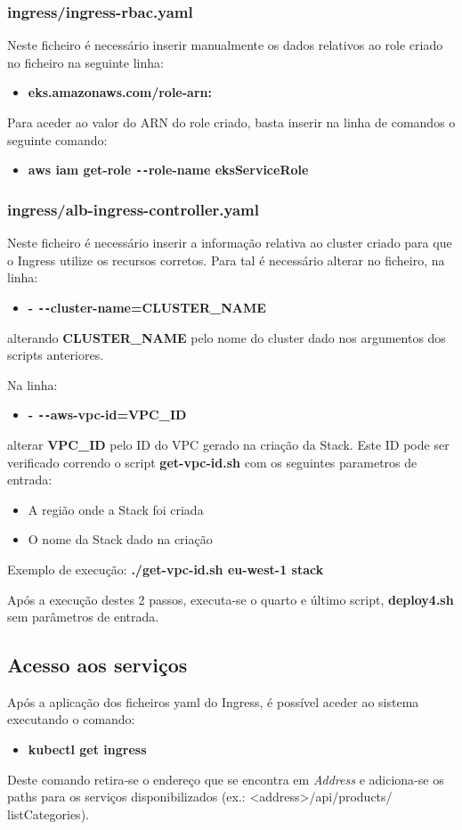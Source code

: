 \documentclass[11pt,a4paper]{article}
\begin{document}
\subsubsection{ingress/ingress-rbac.yaml}
Neste ficheiro é necessário inserir manualmente os dados relativos ao role criado no ficheiro na seguinte linha:
\begin{itemize}
	\item \textbf{eks.amazonaws.com/role-arn:}
\end{itemize}
Para aceder ao valor do ARN do role criado, basta inserir na linha de comandos o seguinte comando:
\begin{itemize}
	\item \textbf{aws iam get-role \texttt{-{}-}role-name eksServiceRole}
\end{itemize}

\subsubsection{ingress/alb-ingress-controller.yaml}
Neste ficheiro é necessário inserir a informação relativa ao cluster criado para que o Ingress utilize os recursos corretos. Para tal é necessário alterar no ficheiro, na linha: 
\begin{itemize}
	\item \textbf{- \texttt{-{}-}cluster-name=CLUSTER\_NAME}
\end{itemize}
alterando \textbf{CLUSTER\_NAME} pelo nome do cluster dado nos argumentos dos scripts anteriores.

Na linha:
\begin{itemize}
	\item \textbf{- \texttt{-{}-}aws-vpc-id=VPC\_ID}
\end{itemize}
alterar \textbf{VPC\_ID} pelo ID do VPC gerado na criação da Stack. Este ID pode ser verificado correndo o script \textbf{get-vpc-id.sh} com os seguintes parametros de entrada:
\begin{itemize}
	\item A região onde a Stack foi criada
	\item O nome da Stack dado na criação
\end{itemize}
Exemplo de execução: \textbf{./get-vpc-id.sh eu-west-1 stack}

Após a execução destes 2 passos, executa-se o quarto e último script, \textbf{deploy4.sh} sem parâmetros de entrada.

\subsection{Acesso aos serviços}
Após a aplicação dos ficheiros yaml do Ingress, é possível aceder ao sistema executando o comando:
\begin{itemize}
	\item \textbf{kubectl get ingress}
\end{itemize}
Deste comando retira-se o endereço que se encontra em \textit{Address} e adiciona-se os paths para os serviços disponibilizados (ex.: <address>/api/products/ listCategories).
\end{document}

